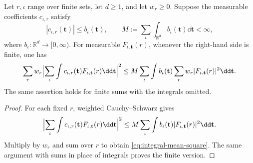 \begin{lemma}\label{lem:recombine}
Let $r,\iota$ range over finite sets, let $d\ge1$, and let $w_r\ge0$.
Suppose the measurable coefficients $c_{\iota,r}$ satisfy
\[
 |c_{\iota,r}(\mathbf t)|\le b_\iota(\mathbf t),\qquad
 M:=\sum_\iota\int_{\mathbb R^d}b_\iota(\mathbf t)\dd\mathbf t<\infty,
\]
where $b_\iota:\mathbb R^d\to[0,\infty)$.
For measurable $F_{\iota,\mathbf t}(r)$, whenever the right-hand
side is finite, one has
\begin{equation}\label{eq:integral-mean-square}
 \sum_r w_r\Bigl|\sum_\iota\int c_{\iota,r}(\mathbf t)
 F_{\iota,\mathbf t}(r)\dd\mathbf t\Bigr|^2
 \le M\sum_\iota\int b_\iota(\mathbf t)
       \sum_r w_r|F_{\iota,\mathbf t}(r)|^2\dd\mathbf t.
\end{equation}
The same assertion holds for finite sums with the integrals omitted.
\end{lemma}
\begin{proof}
For each fixed $r$, weighted Cauchy--Schwarz gives
\[
 \Bigl|\sum_\iota\int c_{\iota,r}(\mathbf t)
 F_{\iota,\mathbf t}(r)\dd\mathbf t\Bigr|^2
 \le M\sum_\iota\int b_\iota(\mathbf t)
 |F_{\iota,\mathbf t}(r)|^2\dd\mathbf t.
\]
Multiply by $w_r$ and sum over $r$ to obtain
\eqref{eq:integral-mean-square}. The same argument with sums in
place of integrals proves the finite version.
\end{proof}

